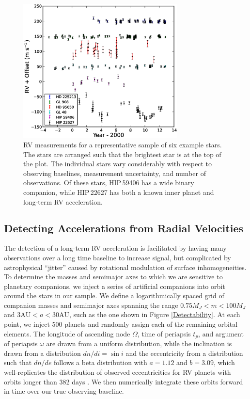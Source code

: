 \begin{figure}[htbp]
\centerline{\includegraphics[width=0.75\textwidth]{chapter3/f2.eps}}
\caption[RV measurements for a representative sample of six example stars]{RV measurements for a representative sample of six example stars. The stars are arranged such that the brightest star is at the top of the plot. The individual stars vary considerably with respect to observing baselines, measurement uncertainty, and number of observations. Of these stars, HIP\,59406 has a wide binary companion, while HIP\,22627 has both a known inner planet and long-term RV acceleration.
  }
\label{RVfig}
\end{figure}

\subsection{Detecting Accelerations from Radial Velocities}
\label{RVs}

The detection of a long-term RV acceleration is facilitated by having many observations over a long time baseline to increase signal, but complicated by astrophysical ``jitter'' caused by rotational modulation of surface inhomogeneities. To determine the masses and semimajor axes to which we are sensitive to planetary companions, we inject a series of artificial companions into orbit around the stars in our sample. We define a logarithmically spaced grid of companion masses and semimajor axes spanning the range $0.75 M_J < m < 100 M_J$ and $3 \textrm{AU} < a < 30 \textrm{AU}$, such as the one shown in Figure \ref{Detectability}. At each point, we inject 500 planets and randomly assign each of the remaining orbital elements. The longitude of ascending node $\Omega$, time of periapsis $t_p$, and argument of periapsis $\omega$ are drawn from a uniform distribution, while the inclination is drawn from a distribution $dn/di = \sin i$ and the eccentricity from a distribution such that $dn/de$ follows a beta distribution with $a = 1.12$ and $b = 3.09$, which well-replicates the distribution of observed eccentricities for RV planets with orbits longer than 382 days \citep{Kipping13}. We then numerically integrate these orbits forward in time over our true observing baseline. 



